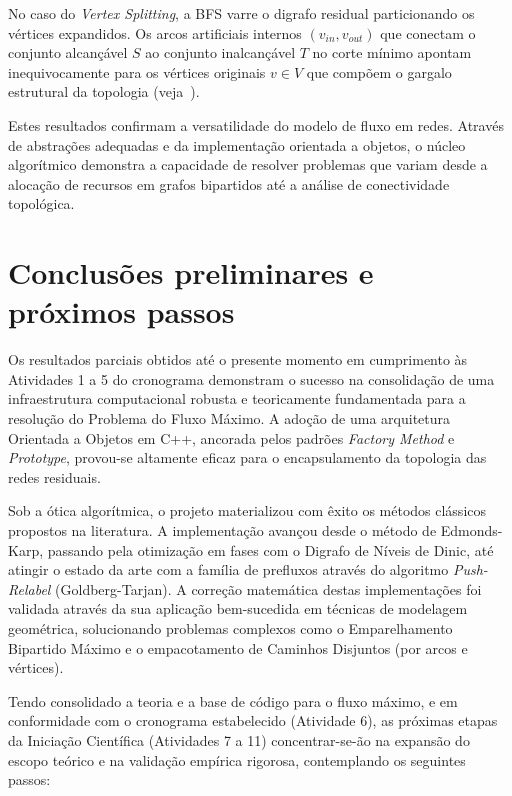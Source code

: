 \documentclass[12pt,a4paper]{article}
\begin{document}
\begin{enumerate}
No caso do \textit{Vertex Splitting}, a BFS varre o digrafo residual particionando os vértices expandidos. Os arcos artificiais internos $(v_{in}, v_{out})$ que conectam o conjunto alcançável $S$ ao conjunto inalcançável $T$ no corte mínimo apontam inequivocamente para os vértices originais $v \in V$ que compõem o gargalo estrutural da topologia (veja~\cite{korte2018combinatorial}).

Estes resultados confirmam a versatilidade do modelo de fluxo em redes. Através de abstrações adequadas e da implementação orientada a objetos, o núcleo algorítmico demonstra a capacidade de resolver problemas que variam desde a alocação de recursos em grafos bipartidos até a análise de conectividade topológica.

\section{Conclusões preliminares e próximos passos}

Os resultados parciais obtidos até o presente momento em cumprimento às Atividades 1 a 5 do cronograma demonstram o sucesso na consolidação de uma infraestrutura computacional robusta e teoricamente fundamentada para a resolução do Problema do Fluxo Máximo. A adoção de uma arquitetura Orientada a Objetos em C++, ancorada pelos padrões \textit{Factory Method} e \textit{Prototype}, provou-se altamente eficaz para o encapsulamento da topologia das redes residuais.

Sob a ótica algorítmica, o projeto materializou com êxito os métodos clássicos propostos na literatura. A implementação avançou desde o método de Edmonds-Karp, passando pela otimização em fases com o Digrafo de Níveis de Dinic, até atingir o estado da arte com a família de prefluxos através do algoritmo \textit{Push-Relabel} (Goldberg-Tarjan). A correção matemática destas implementações foi validada através da sua aplicação bem-sucedida em técnicas de modelagem geométrica, solucionando problemas complexos como o Emparelhamento Bipartido Máximo e o empacotamento de Caminhos Disjuntos (por arcos e vértices).

Tendo consolidado a teoria e a base de código para o fluxo máximo, e em conformidade com o cronograma estabelecido (Atividade 6), as próximas etapas da Iniciação Científica (Atividades 7 a 11) concentrar-se-ão na expansão do escopo teórico e na validação empírica rigorosa, contemplando os seguintes passos:


\end{enumerate}
\end{document}
